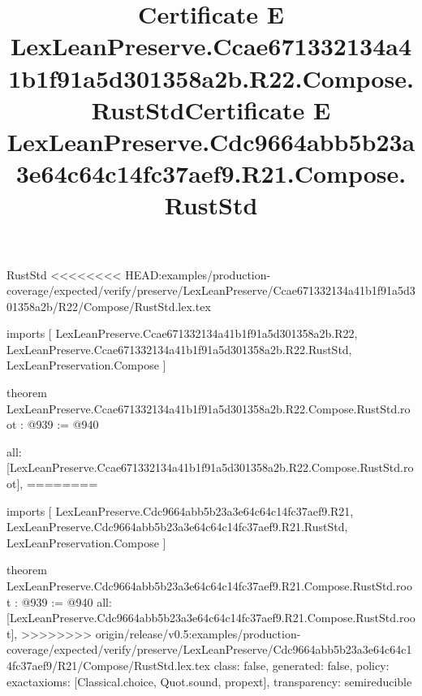 \begin{lexlean}{RustStd}
<<<<<<<< HEAD:examples/production-coverage/expected/verify/preserve/LexLeanPreserve/Ccae671332134a41b1f91a5d301358a2b/R22/Compose/RustStd.lex.tex
\title{Certificate E LexLeanPreserve.Ccae671332134a41b1f91a5d301358a2b.R22.Compose.RustStd}
\begin{coremodule}
imports [
  LexLeanPreserve.Ccae671332134a41b1f91a5d301358a2b.R22,
  LexLeanPreserve.Ccae671332134a41b1f91a5d301358a2b.R22.RustStd,
  LexLeanPreservation.Compose
]

theorem LexLeanPreserve.Ccae671332134a41b1f91a5d301358a2b.R22.Compose.RustStd.root : @939 := @940 {
  all: [LexLeanPreserve.Ccae671332134a41b1f91a5d301358a2b.R22.Compose.RustStd.root],
========
\title{Certificate E LexLeanPreserve.Cdc9664abb5b23a3e64c64c14fc37aef9.R21.Compose.RustStd}
\begin{coremodule}
imports [
  LexLeanPreserve.Cdc9664abb5b23a3e64c64c14fc37aef9.R21,
  LexLeanPreserve.Cdc9664abb5b23a3e64c64c14fc37aef9.R21.RustStd,
  LexLeanPreservation.Compose
]

theorem LexLeanPreserve.Cdc9664abb5b23a3e64c64c14fc37aef9.R21.Compose.RustStd.root : @939 := @940 {
  all: [LexLeanPreserve.Cdc9664abb5b23a3e64c64c14fc37aef9.R21.Compose.RustStd.root],
>>>>>>>> origin/release/v0.5:examples/production-coverage/expected/verify/preserve/LexLeanPreserve/Cdc9664abb5b23a3e64c64c14fc37aef9/R21/Compose/RustStd.lex.tex
  class: false,
  generated: false,
  policy: exact{axioms: [Classical.choice, Quot.sound, propext]},
  transparency: semireducible
}


\end{coremodule}}
\end{coremodule}
\end{lexlean}
